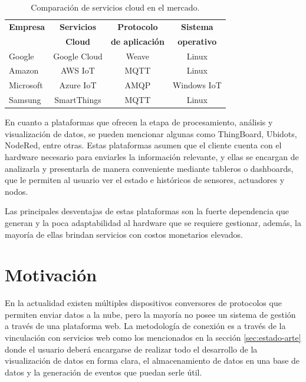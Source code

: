 \begin{table}[h]
	\centering
	\caption[Comparación de servicios cloud en el mercado.]{Comparación de servicios cloud en el mercado.}
	\begin{tabular}{l c c c}    
		\toprule
		\textbf{Empresa} 	 & \textbf{Servicios} 		& \textbf{Protocolo}     & \textbf{Sistema}\\
		 	 						 & \textbf{Cloud} 		& \textbf{de aplicación}     & \textbf{operativo}\\
		\midrule
		Google 			& Google Cloud 				& Weave 		& Linux\\		
		Amazon	 	& AWS IoT						& MQTT		& Linux\\
		Microsoft	 	& Azure IoT						& AMQP 		& Windows IoT\\
		Samsung	 	& SmartThings					& MQTT 		& Linux\\
		\bottomrule
		\hline
	\end{tabular}
	\label{tab:cloud-emp}
\end{table}

En cuanto a plataformas que ofrecen la etapa de procesamiento, análisis y visualización de datos, se pueden mencionar algunas como ThingBoard, Ubidots, NodeRed, entre otras. Estas plataformas asumen que el cliente cuenta con el hardware necesario para enviarles la información relevante, y ellas se encargan de analizarla y presentarla de manera conveniente mediante tableros o dashboards, que le permiten al usuario ver el estado e históricos de sensores, actuadores y nodos. 

Las principales desventajas de estas plataformas son la fuerte dependencia que generan y la poca adaptabilidad al hardware que se requiere gestionar, además, la mayoría de ellas brindan servicios con costos monetarios elevados.



\section{Motivación}

En la actualidad existen múltiples dispositivos conversores de protocolos que permiten enviar datos a la nube, pero la mayoría no posee un sistema de gestión a través de una plataforma web. La metodología de conexión es a través de la vinculación con servicios web como los mencionados en la sección \ref{sec:estado-arte} donde el usuario deberá encargarse de realizar todo el desarrollo de la visualización de datos en forma clara, el almacenamiento de datos en una base de datos y la generación de eventos que puedan serle útil. 

